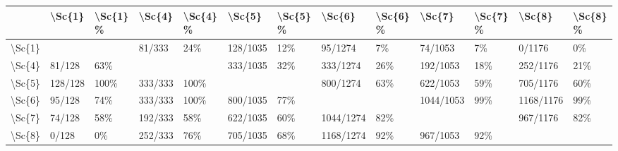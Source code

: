 \begin{tabular}{lllllllllllll}
\toprule
{} &   \textbackslash Sc\{1\} & \textbackslash Sc\{1\} \% &   \textbackslash Sc\{4\} & \textbackslash Sc\{4\} \% &    \textbackslash Sc\{5\} & \textbackslash Sc\{5\} \% &     \textbackslash Sc\{6\} & \textbackslash Sc\{6\} \% &     \textbackslash Sc\{7\} & \textbackslash Sc\{7\} \% &     \textbackslash Sc\{8\} & \textbackslash Sc\{8\} \% \\
\midrule
\textbackslash Sc\{1\} &          &          &   81/333 &      24\% &  128/1035 &      12\% &    95/1274 &       7\% &    74/1053 &       7\% &     0/1176 &       0\% \\
\textbackslash Sc\{4\} &   81/128 &      63\% &          &          &  333/1035 &      32\% &   333/1274 &      26\% &   192/1053 &      18\% &   252/1176 &      21\% \\
\textbackslash Sc\{5\} &  128/128 &     100\% &  333/333 &     100\% &           &          &   800/1274 &      63\% &   622/1053 &      59\% &   705/1176 &      60\% \\
\textbackslash Sc\{6\} &   95/128 &      74\% &  333/333 &     100\% &  800/1035 &      77\% &            &          &  1044/1053 &      99\% &  1168/1176 &      99\% \\
\textbackslash Sc\{7\} &   74/128 &      58\% &  192/333 &      58\% &  622/1035 &      60\% &  1044/1274 &      82\% &            &          &   967/1176 &      82\% \\
\textbackslash Sc\{8\} &    0/128 &       0\% &  252/333 &      76\% &  705/1035 &      68\% &  1168/1274 &      92\% &   967/1053 &      92\% &            &          \\
\bottomrule
\end{tabular}
